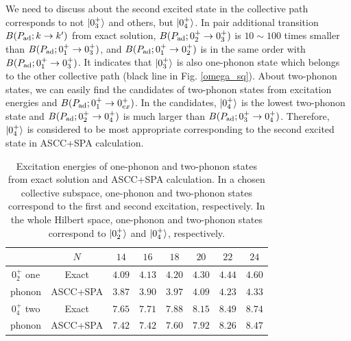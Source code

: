 \documentclass[%
superscriptaddress,
showpacs,
nofootinbib,
amsmath,amssymb,
aps,
prc,
twocolumn,
floatfix ]%
{revtex4-1}
\begin{document}
 We need to discuss about the second excited state in the collective path corresponds to not $\ket{0_3^+}$ and others, but $\ket{0_4^+}$. In pair additional transition $B(P_{\rm ad};k\rightarrow k')$ from exact solution, $B(P_{\rm ad};0_2^+\rightarrow 0_3^+)$ is $10\sim100$ times smaller than $B(P_{\rm ad};0_1^+\rightarrow 0_3^+)$, and $B(P_{\rm ad};0_1^+\rightarrow 0_2^+)$ is in the same order with $B(P_{\rm ad};0_1^+\rightarrow 0_3^+)$. It indicates that $\ket{0_3^+}$ is also one-phonon state which belongs to the other collective path (black line in Fig. \ref{omega_sq}). About two-phonon states, we can easily find the candidates of two-phonon states from excitation energies and $B(P_{\rm ad};0_1^+\rightarrow 0_{ex}^+)$. In the candidates, $\ket{0_4^+}$ is the lowest two-phonon state and $B(P_{\rm ad};0_2^+\rightarrow 0_4^+)$ is much larger than $B(P_{\rm ad};0_3^+\rightarrow 0_4^+)$. Therefore, $\ket{0_4^+}$ is considered to be most appropriate corresponding to the second excited state in ASCC+SPA calculation.
\begin{table}[htbp]
\begin{ruledtabular}
\begin{tabular}{c|c|cccccc}
            & $N$ & $14$ & $16$ & $18$ & $20$ & $22$ & $24$\\ \hline
$0_2^+$ one & Exact & $4.09$ & $4.13$ & $4.20$ & $4.30$ & $4.44$ & $4.60$\\
phonon &ASCC+SPA & $3.87$ & $3.90$ & $3.97$ & $4.09$ & $4.23$ & $4.33$\\ \hline
$0_4^+$ two & Exact & $7.65$ & $7.71$ & $7.88$ & $8.15$ & $8.49$ & $8.74$\\
phonon &ASCC+SPA & $7.42$ & $7.42$ & $7.60$ & $7.92$ & $8.26$ & $8.47$\\
\end{tabular}
\end{ruledtabular}
\caption{Excitation energies of one-phonon and two-phonon states from exact solution and ASCC+SPA calculation. In a chosen collective subspace, one-phonon and two-phonon states correspond to the first and second excitation, respectively. In the whole Hilbert space, one-phonon and two-phonon states correspond to $\ket{0_2^+}$ and $\ket{0_4^+}$, respectively.}
\label{ex}
\end{table}
\end{document}
